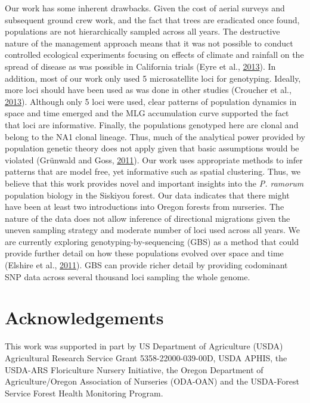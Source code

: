 \documentclass[double,12pt]{beavtex}
\begin{document}
  Our work has some inherent drawbacks. Given the cost of aerial surveys
  and subsequent ground crew work, and the fact that trees are eradicated
  once found, populations are not hierarchically sampled across all years.
  The destructive nature of the management approach means that it was not
  possible to conduct controlled ecological experiments focusing on
  effects of climate and rainfall on the spread of disease as was possible
  in California trials (Eyre et al.,
  \protect\hyperlink{ref-eyre2013poulation}{2013}). In addition, most of
  our work only used 5 microsatellite loci for genotyping. Ideally, more
  loci should have been used as was done in other studies (Croucher et
  al., \protect\hyperlink{ref-croucher2013combining}{2013}). Although only
  5 loci were used, clear patterns of population dynamics in space and
  time emerged and the MLG accumulation curve supported the fact that loci
  are informative. Finally, the populations genotyped here are clonal and
  belong to the NA1 clonal lineage. Thus, much of the analytical power
  provided by population genetic theory does not apply given that basic
  assumptions would be violated (Grünwald and Goss,
  \protect\hyperlink{ref-grunwald2011evolution}{2011}). Our work uses
  appropriate methods to infer patterns that are model free, yet
  informative such as spatial clustering. Thus, we believe that this work
  provides novel and important insights into the \emph{P. ramorum}
  population biology in the Siskiyou forest. Our data indicates that there
  might have been at least two introductions into Oregon forests from
  nurseries. The nature of the data does not allow inference of
  directional migrations given the uneven sampling strategy and moderate
  number of loci used across all years. We are currently exploring
  genotyping-by-sequencing (GBS) as a method that could provide further
  detail on how these populations evolved over space and time (Elshire et
  al., \protect\hyperlink{ref-elshire2011robust}{2011}). GBS can provide
  richer detail by providing codominant SNP data across several thousand
  loci sampling the whole genome.
  
  \section{Acknowledgements}\label{acknowledgements-2}
  
  This work was supported in part by US Department of Agriculture (USDA)
  Agricultural Research Service Grant 5358-22000-039-00D, USDA APHIS, the
  USDA-ARS Floriculture Nursery Initiative, the Oregon Department of
  Agriculture/Oregon Association of Nurseries (ODA-OAN) and the
  USDA-Forest Service Forest Health Monitoring Program.
  
\end{document}

